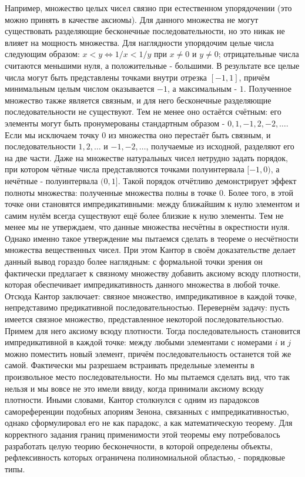 \documentclass[12pt]{article}
\begin{document}
Например, множество целых чисел связно при естественном упорядочении (это можно принять в качестве аксиомы). Для данного множества не могут существовать разделяющие бесконечные последовательности, но это никак не влияет на мощность множества. Для наглядности упорядочим целые числа следующим образом: $x < y \Leftrightarrow 1/x < 1/y$ при $x \neq 0$ и $y \neq 0$; отрицательные числа считаются меньшими нуля, а положительные - большими. В результате все целые числа могут быть представлены точками внутри отрезка $[-1, 1]$, причём минимальным целым числом оказывается $-1$, а максимальным - $1$. Полученное множество также является связным, и для него бесконечные разделяющие последовательности не существуют. Тем не менее оно остаётся счётным: его элементы могут быть пронумерованы стандартным образом - $0, 1, -1, 2, -2, \dots$. Если мы исключаем точку $0$ из множества оно перестаёт быть связным, и последовательности $1, 2, \dots$ и $-1, -2, \dots$, получаемые из исходной, разделяют его на две части. Даже на множестве натуральных чисел нетрудно задать порядок, при котором чётные числа представляются точками полуинтервала $[-1, 0)$, а нечётные - полуинтервала $(0, 1]$.  Такой порядок отчётливо демонстрирует эффект полноты множества: полученные множества полны в точке $0$. Более того, в этой точке они становятся импредикативными: между ближайшим к нулю элементом и самим нулём всегда существуют ещё более близкие к нулю элементы. Тем не менее мы не утверждаем, что данные множества несчётны в окрестности нуля. Однако именно такое утверждение мы пытаемся сделать в теореме о несчётности множества вещественных чисел. При этом Кантор в своём доказательстве делает данный вывод гораздо более наглядным: с формальной точки зрения он фактически предлагает к связному множеству добавить аксиому всюду плотности, которая обеспечивает импредикативность данного множества в любой точке. Отсюда Кантор заключает: связное множество, импредикативное в каждой точке, непредставимо предикативной последовательностью. Перевернём задачу: пусть имеется связное множество, представленное некоторой последовательностью. Примем для него аксиому всюду плотности. Тогда последовательность становится импредикативной в каждой точке: между любыми элементами с номерами $i$ и $j$ можно поместить новый элемент, причём последовательность останется той же самой. Фактически мы разрешаем встраивать предельные элементы в произвольное место последовательности. Но мы пытаемся сделать вид, что так нельзя и мы вовсе не это имели ввиду, когда принимали аксиому всюду плотности. Иными словами, Кантор столкнулся с одним из парадоксов самореференции подобных апориям Зенона, связанных с импредикативностью, однако сформулировал его не как парадокс, а как математическую теорему. Для корректного задания границ применимости этой теоремы ему потребовалось разработать целую теорию бесконечности, в которой определены объекты, рефлексивность которых ограничена полиномиальной областью, - порядковые типы.
\end{document}
